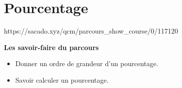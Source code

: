 \chapter{Pourcentage}
{https://sacado.xyz/qcm/parcours_show_course/0/117120}
{ 

 \begin{CpsCol}
 \textbf{Les savoir-faire du parcours} 
 \begin{itemize}
 \item Donner un ordre de grandeur d'un pourcentage.
 \item Savoir calculer un pourcentage.
 \end{itemize}
 \end{CpsCol}
}
%
%
% 
%
% 
%

